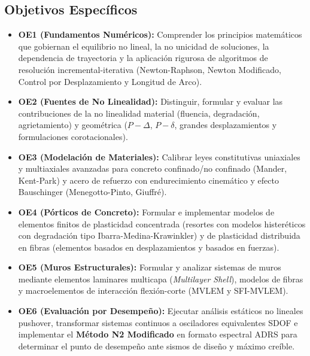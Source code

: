 \documentclass[11pt,letterpaper]{article}
\begin{document}
\subsection{Objetivos Específicos}
\begin{itemize}
    \item \textbf{OE1 (Fundamentos Numéricos):} Comprender los principios matemáticos que gobiernan el equilibrio no lineal, la no unicidad de soluciones, la dependencia de trayectoria y la aplicación rigurosa de algoritmos de resolución incremental-iterativa (Newton-Raphson, Newton Modificado, Control por Desplazamiento y Longitud de Arco).
    \item \textbf{OE2 (Fuentes de No Linealidad):} Distinguir, formular y evaluar las contribuciones de la no linealidad material (fluencia, degradación, agrietamiento) y geométrica ($P-\Delta$, $P-\delta$, grandes desplazamientos y formulaciones corotacionales).
    \item \textbf{OE3 (Modelación de Materiales):} Calibrar leyes constitutivas uniaxiales y multiaxiales avanzadas para concreto confinado/no confinado (Mander, Kent-Park) y acero de refuerzo con endurecimiento cinemático y efecto Bauschinger (Menegotto-Pinto, Giuffré).
    \item \textbf{OE4 (Pórticos de Concreto):} Formular e implementar modelos de elementos finitos de plasticidad concentrada (resortes con modelos histeréticos con degradación tipo Ibarra-Medina-Krawinkler) y de plasticidad distribuida en fibras (elementos basados en desplazamientos y basados en fuerzas).
    \item \textbf{OE5 (Muros Estructurales):} Formular y analizar sistemas de muros mediante elementos laminares multicapa (\textit{Multilayer Shell}), modelos de fibras y macroelementos de interacción flexión-corte (MVLEM y SFI-MVLEM).
    \item \textbf{OE6 (Evaluación por Desempeño):} Ejecutar análisis estáticos no lineales pushover, transformar sistemas continuos a osciladores equivalentes SDOF e implementar el \textbf{Método N2 Modificado} en formato espectral ADRS para determinar el punto de desempeño ante sismos de diseño y máximo creíble.
\end{itemize}
\end{document}
